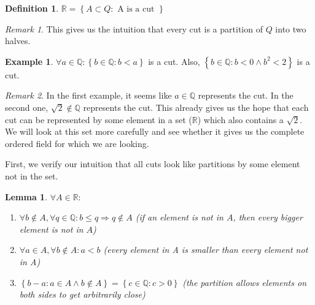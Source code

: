 \documentclass{article}
\newcommand\R{\ensuremath{\mathbb{R}}}
\newcommand\Q{\ensuremath{\mathbb{Q}}}
\newtheorem{lemma}[theorem]{Lemma}
\theoremstyle{definition}
\newtheorem{definition}{Definition}[subsection]
\newtheorem{eg}{Example}[subsection]
\theoremstyle{remark}
\newtheorem*{remark}{Remark}
\theoremstyle{plain}
\begin{document}
\begin{definition}
    \(\R = \left\{ A \subset Q: \text{ A is a cut } \right\}\)
\end{definition}

\begin{remark}
    This gives us the intuition that every cut is a partition of \(Q\) into two halves.
\end{remark}

\begin{eg}
    \(\forall a \in \Q: \left\{ b \in \Q: b < a \right\}\) is a cut. Also, \(\left\{ b \in \Q: b < 0 \land b^2 < 2 \right\}\) is a cut. 
\end{eg}

\begin{remark}
    In the first example, it seems like \(a \in \Q\) represents the cut. In the second one, \(\sqrt{2} \notin \Q\) represents the cut. 
    This already gives us the hope that each cut can be represented by some element in a set (\(\R\)) which also contains a \(\sqrt{2}\). 
    We will look at this set more carefully and see whether it gives us the complete ordered field for which we are looking. 
\end{remark}

First, we verify our intuition that all cuts look like partitions  by some element not in the set. 

\begin{lemma}
    \(\forall A \in \R:\)
    \begin{enumerate}
        \item \(\forall b \notin A, \forall q \in \Q: b \leq q \Rightarrow q \notin A\) (if an element is not in \(A\), then every bigger element is not in \(A\))
        \item \(\forall a \in A, \forall b \notin A: a < b\) (every element in A is smaller than every element not in A)
        \item \(\left\{ b - a: a \in A \land b \notin A \right\} = \left\{ c \in \Q: c > 0 \right\}\) (the partition allows elements on both sides to get arbitrarily close)
    \end{enumerate}
\end{lemma}
\end{document}
